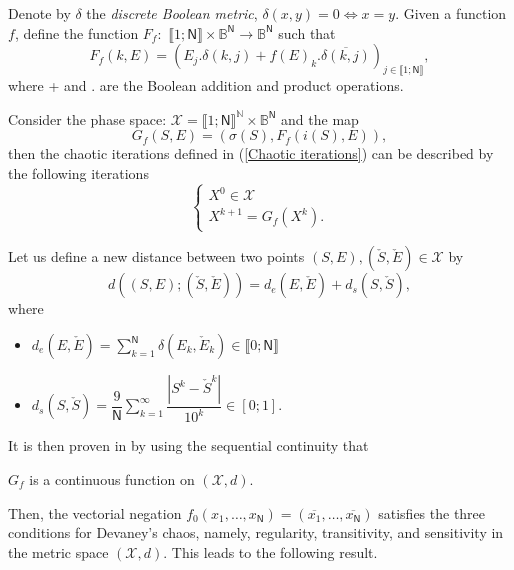 \documentclass[journal]{IEEEtran}
\begin{document}
Denote by $\delta $ the \emph{discrete Boolean metric}, $\delta
(x,y)=0\Leftrightarrow x=y.$ Given a function $f$, define the function $F_{f}:$ $\llbracket1;\mathsf{N}\rrbracket\times \mathds{B}^{\mathsf{N}}\longrightarrow \mathds{B}^{\mathsf{N}}$ such that $$F_{f}(k,E)=\left(
E_{j}.\delta (k,j)+f(E)_{k}.\overline{\delta (k,j)}\right) _{j\in \llbracket 1;\mathsf{N}\rrbracket},$$ where + and . are the Boolean addition and product operations.

Consider the phase space: $\mathcal{X}=\llbracket1;\mathsf{N}\rrbracket^{\mathds{N}}\times \mathds{B}^{\mathsf{N}}$ and the map $$G_{f}\left( S,E\right) =\left( \sigma
(S),F_{f}(i(S),E)\right) ,$$ then the chaotic iterations defined in (\ref{Chaotic iterations}) can be described by the following iterations \cite{guyeux09}
\[
\left\{
\begin{array}{l}
X^{0}\in \mathcal{X} \\
X^{k+1}=G_{f}(X^{k}).\end{array}\right.
\]

Let us define a new distance between two points $(S,E),(\check{S},\check{E})\in
\mathcal{X}$ by $$d((S,E);(\check{S},\check{E}))=d_{e}(E,\check{E})+d_{s}(S,\check{S}),$$ where
\begin{itemize}
\item $\displaystyle{d_{e}(E,\check{E})}=\displaystyle{\sum_{k=1}^{\mathsf{N}}\delta (E_{k},\check{E}_{k})} \in \llbracket 0 ; \mathsf{N} \rrbracket$ \\
\item $\displaystyle{d_{s}(S,\check{S})}=\displaystyle{\dfrac{9}{\mathsf{N}}\sum_{k=1}^{\infty }\dfrac{|S^{k}-\check{S}^{k}|}{10^{k}}} \in [0 ; 1].$
\end{itemize}

\medskip

It is then proven in \cite{guyeux09} by using the sequential continuity that



\begin{proposition}
\label{continuite} $G_f$ is a continuous function on $(\mathcal{X},d)$.
\end{proposition}

Then, the vectorial negation $f_{0}(x_{1},\hdots,x_{\mathsf{N}})=(\overline{x_{1}},\hdots,\overline{x_{\mathsf{N}}})$ satisfies the three conditions for Devaney's chaos, namely, regularity, transitivity, and sensitivity in the metric space $(\mathcal{X},d)$. This leads to the following result.
\end{document}
